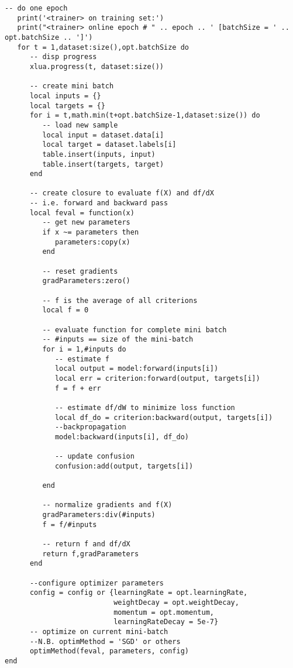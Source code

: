 \begin{lstlisting}[language={[5.2]Lua}]
   -- do one epoch
   print('<trainer> on training set:')
   print("<trainer> online epoch # " .. epoch .. ' [batchSize = ' .. opt.batchSize .. ']')
   for t = 1,dataset:size(),opt.batchSize do
      -- disp progress
      xlua.progress(t, dataset:size())

      -- create mini batch
      local inputs = {}
      local targets = {}
      for i = t,math.min(t+opt.batchSize-1,dataset:size()) do
         -- load new sample
         local input = dataset.data[i]
         local target = dataset.labels[i]
         table.insert(inputs, input)
         table.insert(targets, target)
      end

      -- create closure to evaluate f(X) and df/dX
      -- i.e. forward and backward pass
      local feval = function(x)
         -- get new parameters
         if x ~= parameters then
            parameters:copy(x)
         end

         -- reset gradients
         gradParameters:zero()

         -- f is the average of all criterions
         local f = 0

         -- evaluate function for complete mini batch
         -- #inputs == size of the mini-batch
         for i = 1,#inputs do
            -- estimate f
            local output = model:forward(inputs[i])
            local err = criterion:forward(output, targets[i])
            f = f + err

            -- estimate df/dW to minimize loss function
            local df_do = criterion:backward(output, targets[i])
            --backpropagation
            model:backward(inputs[i], df_do)

            -- update confusion
            confusion:add(output, targets[i])
            
         end

         -- normalize gradients and f(X)
         gradParameters:div(#inputs)
         f = f/#inputs

         -- return f and df/dX
         return f,gradParameters
      end

	  --configure optimizer parameters
      config = config or {learningRate = opt.learningRate,
           				  weightDecay = opt.weightDecay,
            		      momentum = opt.momentum,
            			  learningRateDecay = 5e-7}
      -- optimize on current mini-batch
	  --N.B. optimMethod = 'SGD' or others
      optimMethod(feval, parameters, config)
end
\end{lstlisting}

